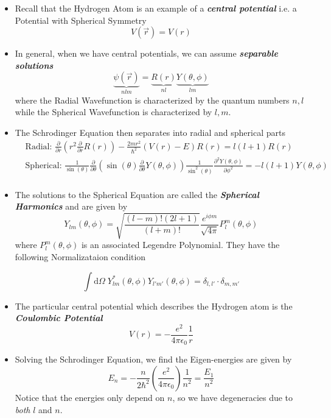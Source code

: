 \documentclass{article}
\begin{document}
\vskip 0.5cm
\begin{itemize}
  \item Recall that the Hydrogen Atom is an example of a \emph{\textbf{central potential}} i.e. a Potential with Spherical Symmetry
  \[ V(\vec{r}) = V(r) \]

  \vskip 0.25cm
  \item In general, when we have central potentials, we can assume \emph{\textbf{separable solutions}} 
  \[ \underbrace{\psi(\vec{r})}_{nlm} = \underbrace{R(r)}_{nl} \underbrace{Y(\theta, \phi)}_{lm} \]
  where the Radial Wavefunction is characterized by the quantum numbers $n, l$ while the Spherical Wavefunction is characterized by $l, m$.

  \vskip 0.25cm
  \item The Schrodinger Equation then separates into radial and spherical parts 
  \begin{align*}
    &\text{Radial: } \frac{\partial}{\partial r} \left( r^2 \frac{\partial}{\partial r} R(r) \right) - \frac{2mr^2}{\hbar^2} \left( V(r) - E \right) R(r) = l(l+1)R(r) \\
    &\text{Spherical: } \frac{1}{\sin(\theta)} \frac{\partial}{\partial \theta} \left( \sin(\theta) \frac{\partial}{\partial \theta} Y(\theta, \phi) \right) \frac{1}{\sin^2(\theta)} \frac{\partial^2 Y(\theta, \phi)}{\partial \phi^2} = -l(l+1)Y(\theta, \phi) \\
  \end{align*}

  \vskip 0.25cm
  \item The solutions to the Spherical Equation are called the \emph{\textbf{Spherical Harmonics}} and are given by 
  \[ Y_{lm}(\theta, \phi) = \sqrt{\frac{(l-m)!(2l+1)}{(l+m)!}} \frac{e^{i\phi m}}{\sqrt{4\pi}} P^m_l(\theta, \phi) \]
  where $ P^m_l(\theta, \phi)$  is an associated Legendre Polynomial. They have the following Normalizataion condition 

  \[ \int \mathrm{d}\Omega\; Y_{lm}^{*}(\theta, \phi) Y_{l'm'}(\theta, \phi) = \delta_{l,l'} \cdot \delta_{m,m'} \]

  \vskip 0.25cm
  \item The particular central potential which describes the Hydrogen atom is the \emph{\textbf{Coulombic Potential}}
  \[ V(r) = - \frac{e^2}{4\pi \epsilon_0} \frac{1}{r} \]

  \vskip 0.25cm
  \item Solving the Schrodinger Equation, we find the Eigen-energies are given by 
  \[ E_n = -\frac{n}{2\hbar^2} \left( \frac{e^2}{4\pi \epsilon_0} \right) \frac{1}{n^2} = \frac{E_1}{n^2}\]
  Notice that the energies only depend on $n$, so we have degeneracies due to \emph{both} $l$ and $n$.


\end{itemize}
\end{document}
